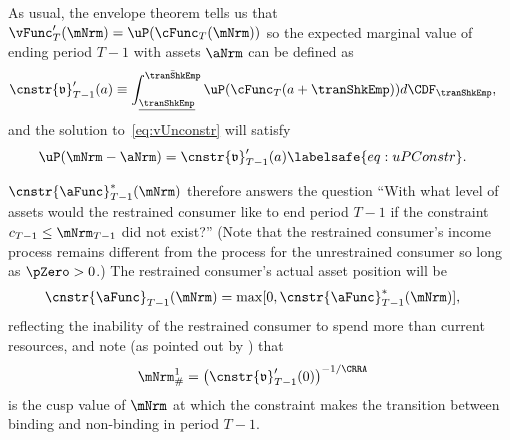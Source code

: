 \documentclass[\econtexRoot/BufferStockTheory]{subfiles}
\begin{document}
As usual, the envelope theorem tells us that $\vFunc_{T}^{\prime}(\mNrm)=\uP(\cFunc_{T}(\mNrm))$ so the expected marginal value of ending period $T-1$ with assets $\aNrm$ can be defined as
\begin{equation}\begin{gathered}\begin{aligned}
      \cnstr{\mathfrak{v}}_{T-1}^{\prime}(a)  & \equiv  \int_{\underline{\tranShkEmp}}^{\bar{\tranShkEmp}} \uP(\cFunc_{T}(a+\tranShkEmp)) d\CDF_{\tranShkEmp}, \notag
    \end{aligned}\end{gathered}\end{equation}
and the solution to~\eqref{eq:vUnconstr} will satisfy
\begin{equation}\begin{gathered}\begin{aligned}
      \uP(\mNrm-\aNrm)  & =  \cnstr{\mathfrak{v}}_{T-1}^{\prime}(a) \labelsafe{eq:uPConstr}.
    \end{aligned}\end{gathered}\end{equation}

$\cnstr{\aFunc}_{T-1}^{*}(\mNrm)$ therefore answers the question ``With what level of assets would the restrained consumer like to end period $T-1$ if the constraint $c_{T-1} \leq \mNrm_{T-1}$ did not exist?''  (Note that the restrained consumer's income process remains different from the process for the unrestrained consumer so long as $\pZero>0$.)
The restrained consumer's actual asset position will be
\begin{equation}\begin{gathered}\begin{aligned}
      \cnstr{\aFunc}_{T-1}(\mNrm)  & = \max[0,\cnstr{\aFunc}^{*}_{T-1}(\mNrm)], \notag
    \end{aligned}\end{gathered}\end{equation}
reflecting the inability of the restrained consumer to spend more than current resources, and note (as pointed out by \cite{deatonLiqConstr}) that
\begin{equation}\begin{gathered}\begin{aligned}
      \mNrm^{1}_{\#}  & = {\left( \cnstr{\mathfrak{v}}_{T-1}^{\prime}(0)\right)}^{-1/\CRRA} \notag
    \end{aligned}\end{gathered}\end{equation}
is the cusp value of $\mNrm$ at which the constraint makes the
transition between binding and non-binding in period $T-1$.
\end{document}
